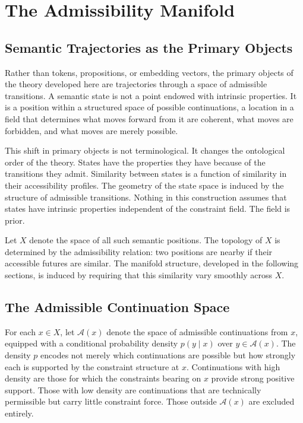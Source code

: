 \documentclass[12pt, oneside]{book}
\theoremstyle{plain-flyxion}
\theoremstyle{definition-flyxion}
\newcommand{\A}{\mathcal{A}}
\begin{document}
\chapter{The Admissibility Manifold}

\section{Semantic Trajectories as the Primary Objects}

Rather than tokens, propositions, or embedding vectors, the primary objects of the theory
developed here are trajectories through a space of admissible transitions. A semantic
state is not a point endowed with intrinsic properties. It is a position within a
structured space of possible continuations, a location in a field that determines what
moves forward from it are coherent, what moves are forbidden, and what moves are merely
possible.

This shift in primary objects is not terminological. It changes the ontological order of
the theory. States have the properties they have because of the transitions they admit.
Similarity between states is a function of similarity in their accessibility profiles. The
geometry of the state space is induced by the structure of admissible transitions. Nothing
in this construction assumes that states have intrinsic properties independent of the
constraint field. The field is prior.

Let $X$ denote the space of all such semantic positions. The topology of $X$ is determined
by the admissibility relation: two positions are nearby if their accessible futures are
similar. The manifold structure, developed in the following sections, is induced by
requiring that this similarity vary smoothly across $X$.

\section{The Admissible Continuation Space}

For each $x\in X$, let $\A(x)$ denote the space of admissible continuations from $x$,
equipped with a conditional probability density $p(y\mid x)$ over $y\in\A(x)$. The
density $p$ encodes not merely which continuations are possible but how strongly each
is supported by the constraint structure at $x$. Continuations with high density are
those for which the constraints bearing on $x$ provide strong positive support. Those
with low density are continuations that are technically permissible but carry little
constraint force. Those outside $\A(x)$ are excluded entirely.
\end{document}
